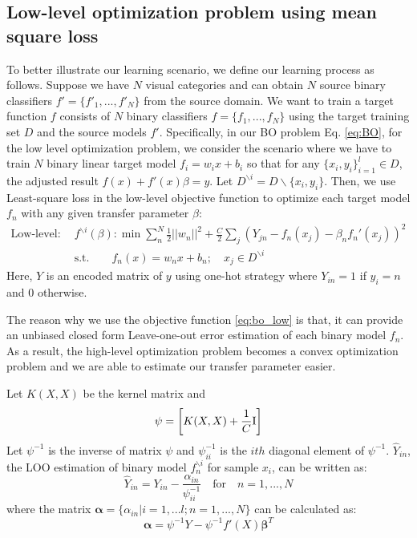 \subsection{Low-level optimization problem using mean square loss}
To better illustrate our learning scenario, we define our learning process as follows. Suppose we have $N$ visual categories and 
can obtain $N$ source binary classifiers $f'=\{f'_1,...,f'_N\}$ from the source domain. We want to train a target function $f$ consists of $N$ binary classifiers $f=\{f_1,...,f_N\}$ using the target training set $D$ and the source models $f'$.
Specifically, in our BO problem Eq. \eqref{eq:BO}, for the low level optimization problem, we consider the scenario where we have to train $N$ binary linear target model $f_i = w_ix+b_i$ so that for any $\{x_i,y_i\}_{i=1}^l \in D$, the adjusted result $f(x)+f'(x)\beta = y$. Let $D^{\backslash i} = D\backslash\{x_i,y_i\}$.
Then, we use Least-square loss in the low-level objective function to optimize each target model $f_n$ with any given transfer parameter $\beta$:
\begin{equation}\label{eq:bo_low}
\begin{aligned}
\text{Low-level:}\quad&f^{\backslash i}(\beta) : \min \sum_n^N\frac{1}{2}||w_n||^2+\frac{C}{2}\sum_j\left(Y_{jn}-f_n(x_j)-\beta_n f_n'(x_j)\right)^2\\
&\text{s.t.} \qquad f_n(x) = w_nx+b_n; \quad x_j \in D^{\backslash i}
\end{aligned}
\end{equation}
Here, $Y$ is an encoded matrix of $y$ using one-hot strategy where $Y_{in} =1$ if $y_i=n$ and 0 otherwise.

The reason why we use the objective function \eqref{eq:bo_low} is that, it can provide an unbiased closed form Leave-one-out error estimation of each binary model $f_n$\cite{cawley2006leave}. As a result, the high-level optimization problem becomes a convex optimization problem and we are able to estimate our transfer parameter easier.

Let $K(X,X)$ be the kernel matrix and
\begin{equation}\label{eq:linear}
\psi=\left[ 
{K(X,X) + \frac{1}{C}{\rm{I}}} \right]
\end{equation}
Let $\psi^{-1}$ is the inverse of matrix $\psi$ and  $\psi_{ii}^{-1}$ is the $ith$ diagonal element of $\psi^{-1}$. $\hat{Y}_{in}$, the LOO estimation of binary model $f^{\backslash i}_n$ for sample $x_i$, can be written as:
\begin{equation} \label{eq:loo}
{\hat Y_{in}} = {Y_{in}} - \frac{{{\alpha _{in}}}}{{\psi_{ii}^{ - 1}}}\quad {\text{for}}\quad n = 1,...,N
\end{equation}
where the matrix $\boldsymbol{\alpha}=\{\alpha_{in}|i=1,...l;n=1,...,N\}$ can be calculated as:
\begin{equation}
\boldsymbol{\alpha} =\psi^{-1} Y - \psi^{-1} f'(X)\boldsymbol{\beta}^T
\end{equation}

